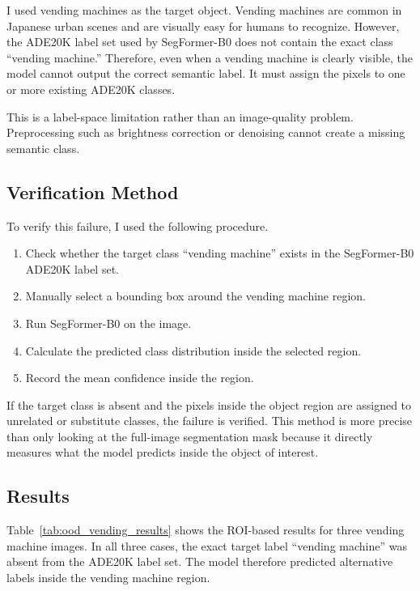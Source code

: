 \documentclass[10pt,a4paper]{article}
\begin{document}
I used vending machines as the target object.
Vending machines are common in Japanese urban scenes and are visually easy for humans to recognize.
However, the ADE20K label set used by SegFormer-B0 does not contain the exact class ``vending machine.''
Therefore, even when a vending machine is clearly visible, the model cannot output the correct semantic label.
It must assign the pixels to one or more existing ADE20K classes.

This is a label-space limitation rather than an image-quality problem.
Preprocessing such as brightness correction or denoising cannot create a missing semantic class.

\subsection{Verification Method}

To verify this failure, I used the following procedure.

\begin{enumerate}
    \item Check whether the target class ``vending machine'' exists in the SegFormer-B0 ADE20K label set.
    \item Manually select a bounding box around the vending machine region.
    \item Run SegFormer-B0 on the image.
    \item Calculate the predicted class distribution inside the selected region.
    \item Record the mean confidence inside the region.
\end{enumerate}

If the target class is absent and the pixels inside the object region are assigned to unrelated or substitute classes, the failure is verified.
This method is more precise than only looking at the full-image segmentation mask because it directly measures what the model predicts inside the object of interest.

\subsection{Results}

Table~\ref{tab:ood_vending_results} shows the ROI-based results for three vending machine images.
In all three cases, the exact target label ``vending machine'' was absent from the ADE20K label set.
The model therefore predicted alternative labels inside the vending machine region.
\end{document}
